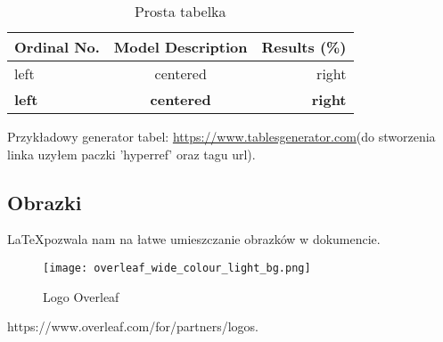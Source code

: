 \documentclass{article}
\begin{document}
\begin{table}[h!]
\centering
\begin{tabular}{|l|c|r|}
\hline
Ordinal No.   & Model Description & Results (\%)   \\ 
\hline
left          & centered            & right          \\ 
\hline
\textbf{left} & \textbf{centered}   & \textbf{right} \\ 
\hline
\end{tabular}
\caption{Prosta tabelka}
\end{table}
Przykładowy generator tabel: \url{https://www.tablesgenerator.com}(do stworzenia
linka uzyłem paczki ’hyperref’ oraz tagu url).
\subsection{Obrazki}
\LaTeX pozwala nam na łatwe umieszczanie obrazków w dokumencie.

\begin{figure}[h!]
    \centering
    \texttt{[image: overleaf\_wide\_colour\_light\_bg.png]}
    \caption{Logo Overleaf \cite{picture}}
    \label{fig:enter-label}
\end{figure}


\begin{thebibliography}{9}
https://www.overleaf.com/for/partners/logos.

\end{thebibliography}
\end{document}
